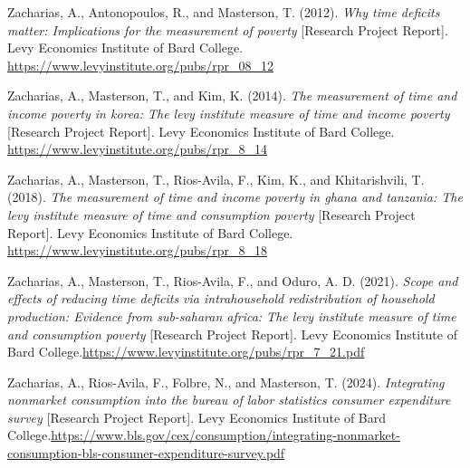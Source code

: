 \documentclass[
  11pt,
]{article}
\newlength{\cslhangindent}
\newenvironment{CSLReferences}[2] %
 {\begin{list}{}{%
  \setlength{\itemindent}{0pt}
  \setlength{\leftmargin}{0pt}
  \setlength{\parsep}{0pt}
  \ifodd #1
   \setlength{\leftmargin}{\cslhangindent}
   \setlength{\itemindent}{-1\cslhangindent}
  \fi
  \setlength{\itemsep}{#2\baselineskip}}}
 {\end{list}}
\begin{document}
\begin{CSLReferences}{1}{0}
Zacharias, A., Antonopoulos, R., and Masterson, T. (2012). \emph{Why
time deficits matter: Implications for the measurement of poverty}
{[}Research Project Report{]}. Levy Economics Institute of Bard College.
\url{https://www.levyinstitute.org/pubs/rpr_08_12}

Zacharias, A., Masterson, T., and Kim, K. (2014). \emph{The measurement
of time and income poverty in korea: The levy institute measure of time
and income poverty} {[}Research Project Report{]}. Levy Economics
Institute of Bard College.
\url{https://www.levyinstitute.org/pubs/rpr_8_14}

Zacharias, A., Masterson, T., Rios-Avila, F., Kim, K., and
Khitarishvili, T. (2018). \emph{The measurement of time and income
poverty in ghana and tanzania: The levy institute measure of time and
consumption poverty} {[}Research Project Report{]}. Levy Economics
Institute of Bard College.
\url{https://www.levyinstitute.org/pubs/rpr_8_18}

Zacharias, A., Masterson, T., Rios-Avila, F., and Oduro, A. D. (2021).
\emph{Scope and effects of reducing time deficits via intrahousehold
redistribution of household production: Evidence from sub-saharan
africa: The levy institute measure of time and consumption poverty}
{[}Research Project Report{]}. Levy Economics Institute of Bard
College.\href{\%20https://www.levyinstitute.org/pubs/rpr_7_21.pdf}{https://www.levyinstitute.org/pubs/rpr\_7\_21.pdf}

Zacharias, A., Rios-Avila, F., Folbre, N., and Masterson, T. (2024).
\emph{Integrating nonmarket consumption into the bureau of labor
statistics consumer expenditure survey} {[}Research Project Report{]}.
Levy Economics Institute of Bard
College.\href{\%20https://www.bls.gov/cex/consumption/integrating-nonmarket-consumption-bls-consumer-expenditure-survey.pdf}{https://www.bls.gov/cex/consumption/integrating-nonmarket-consumption-bls-consumer-expenditure-survey.pdf}

\end{CSLReferences}
\end{document}
